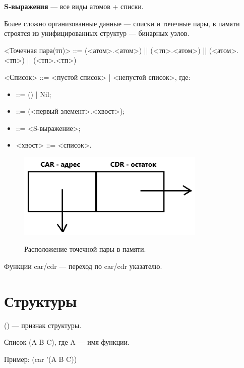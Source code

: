 \textbf{S-выражения} — все виды атомов + списки.

Более сложно организованные данные — списки и точечные пары, в памяти 
строятся из унифицированных структур — бинарных узлов.

\begin{center}
	<Точечная пара(тп)> ::= (<атом>.<атом>) || (<тп>.<атом>) || (<атом>.<тп>) || (<тп>.<тп>)
\end{center}

<Список> ::= <пустой список> | <непустой список>, где:

\begin{itemize}[label=—]
	\item <пустой список> ::= () | Nil;
	\item <непустой список> ::= (<первый элемент>.<хвост>);
	\item <первый элемент> ::= <S-выражение>;
	\item <хвост> ::= <список>.
\end{itemize}

\begin{figure}[H]
    \begin{imagebox}
        \centering
        \includegraphics[width=0.8\textwidth]{img/car-cdr.png}
        \label{fig:tp-car-cdr}
    \end{imagebox}
    \caption{Расположение точечной пары в памяти.}
\end{figure}

Функции car/cdr — переход по car/cdr указателю.

\section{Структуры}

() — признак структуры.

Список (A B C), где A — имя функции.

Пример: (car '(A B C))